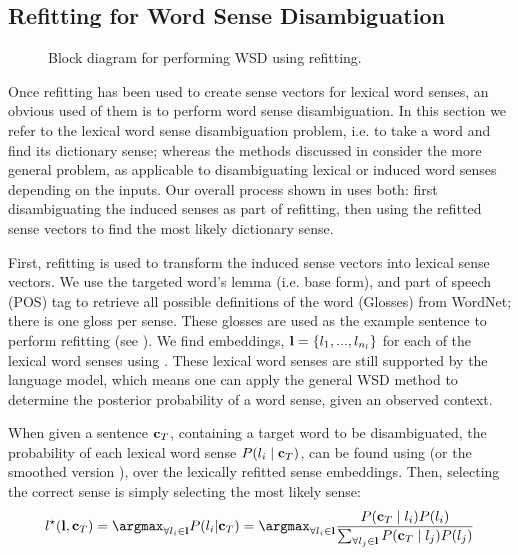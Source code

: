 {\subsection{Refitting for Word Sense Disambiguation} 
\begin{figure}
	\centering
	\begin{adjustbox}{max width=0.9\linewidth}
		
	\end{adjustbox}
	\caption{Block diagram for performing WSD using refitting.\label{WSDBlock}} 
\end{figure}
Once refitting has been used to create sense vectors for lexical word senses, an obvious used of them is to perform word sense disambiguation.
In this section we refer to the lexical word sense disambiguation problem, i.e. to take a word and find its dictionary sense;
whereas the methods discussed in  consider the more general problem, as applicable to disambiguating lexical or induced word senses depending on the inputs.
Our overall process shown in  uses both: first disambiguating the induced senses as part of refitting, then using the refitted sense vectors to find the most likely dictionary sense.

First, refitting is used to transform the induced sense vectors into lexical sense vectors.
We use the targeted word's lemma (i.e. base form), and part of speech (POS) tag to retrieve all possible definitions of the word (Glosses) from WordNet; there is one gloss per sense.
These glosses are used as the example sentence to perform refitting (see ).
We find embeddings, $\mathbf{l}=\{l_1,..., l_{n_l}\}$ for each of the lexical word senses using .
These lexical word senses are still supported by the language model, which means one can apply the general WSD method to determine the posterior probability of a word sense, given an observed context. 

When given a sentence $\mathbf{c}_{T}$, containing a target word to be disambiguated, 
the probability of each lexical word sense $P(l_i \mid \mathbf{c}_{T})$, can be found using  (or the smoothed version ), over the lexically refitted sense embeddings.
Then, selecting the correct sense is simply selecting the most likely sense:
\begin{equation}
\label{eq:lexicalwsd}
l^\star (\l, \c_T) 
= \argmax_{\forall l_i \in \l} P(l_i|\c_T) 
= \argmax_{\forall l_i \in \l} \frac{P(\c_T \mid l_i)P(l_i)}{\sum_{\forall l_j \in \l} P(\c_T \mid l_j)P(l_j)}
\end{equation}


}
